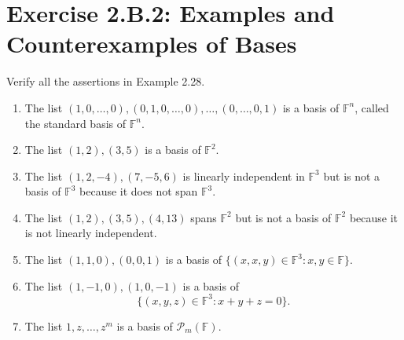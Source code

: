 \section{Exercise 2.B.2: Examples and Counterexamples of Bases}\label{Exercise 2.B.2}
Verify all the assertions in Example 2.28.
\begin{enumerate}[label=(\alph*)]
\item The list $(1,0,\dots,0),(0,1,0,\dots,0),\dots,(0,\dots,0,1)$ is a basis of $\mathbb{F}^n$,
called the standard basis of $\mathbb{F}^n$.
\item The list $(1, 2), (3,5)$ is a basis of $\mathbb{F}^2$.
\item The list $(1, 2, -4), (7,-5, 6)$ is linearly independent in $\mathbb{F}^3$ but is not a basis of $\mathbb{F}^3$ because it does not span $\mathbb{F}^3$.
\item The list $(1, 2), (3, 5), (4, 13)$ spans $\mathbb{F}^2$ but is not a basis of $\mathbb{F}^2$ because it is not linearly independent.
\item The list $(1,1,0),(0,0,1)$ is a basis of $\{(x,x,y)\in\mathbb{F}^3:x,y\in\mathbb{F}\}$.
\item The list $(1,-1,0),(1,0,-1)$ is a basis of\[
\{(x,y,z)\in\mathbb{F}^3: x+y+z=0\}.
\]
\item The list $1,z,\dots,z^m$ is a basis of $\mathcal{P}_m(\mathbb{F})$.
\end{enumerate}
